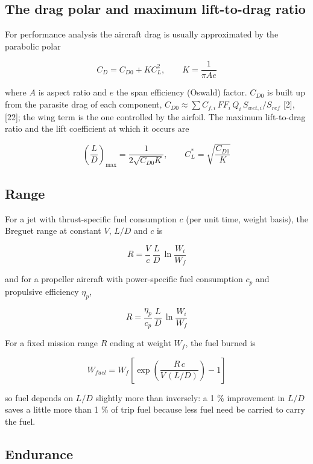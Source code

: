 \documentclass[10pt,a4paper,twocolumn]{article}
\begin{document}
\hypertarget{the-drag-polar-and-maximum-lift-to-drag-ratio}{%
\subsection{The drag polar and maximum lift-to-drag
ratio}\label{the-drag-polar-and-maximum-lift-to-drag-ratio}}

For performance analysis the aircraft drag is usually approximated by
the parabolic polar

\[C_D = C_{D0} + K C_L^2, \qquad K = \frac{1}{\pi A e} \tag{5}\]

where \(A\) is aspect ratio and \(e\) the span efficiency (Oswald)
factor. \(C_{D0}\) is built up from the parasite drag of each component,
\(C_{D0}\approx\sum C_{f,i}\,FF_i\,Q_i\,S_{wet,i}/S_{ref}\) {[}2{]},
{[}22{]}; the wing term is the one controlled by the airfoil. The
maximum lift-to-drag ratio and the lift coefficient at which it occurs
are

\[\left(\frac{L}{D}\right)_{\max} = \frac{1}{2\sqrt{C_{D0}K}}, \qquad C_L^* = \sqrt{\frac{C_{D0}}{K}} \tag{6}\]

\hypertarget{range}{%
\subsection{Range}\label{range}}

For a jet with thrust-specific fuel consumption \(c\) (per unit time,
weight basis), the Breguet range at constant \(V\), \(L/D\) and \(c\) is

\[R = \frac{V}{c}\,\frac{L}{D}\,\ln\frac{W_i}{W_f} \tag{7}\]

and for a propeller aircraft with power-specific fuel consumption
\(c_p\) and propulsive efficiency \(\eta_p\),

\[R = \frac{\eta_p}{c_p}\,\frac{L}{D}\,\ln\frac{W_i}{W_f} \tag{8}\]

For a fixed mission range \(R\) ending at weight \(W_f\), the fuel
burned is

\[W_{fuel} = W_f\left[\exp\!\left(\frac{R\,c}{V\,(L/D)}\right)-1\right] \tag{9}\]

so fuel depends on \(L/D\) slightly more than inversely: a 1 \%
improvement in \(L/D\) saves a little more than 1 \% of trip fuel
because less fuel need be carried to carry the fuel.

\hypertarget{endurance}{%
\subsection{Endurance}\label{endurance}}
\end{document}
